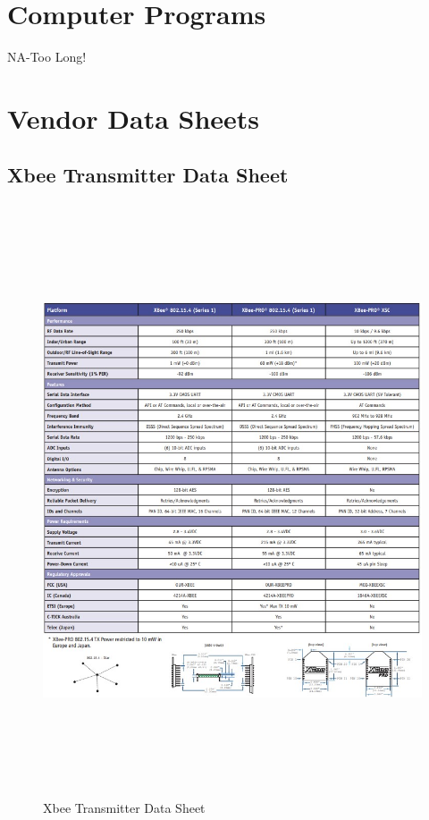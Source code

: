 \documentclass[12pt]{article}
\begin{document}
{{{{		\clearpage
	
	\section{Computer Programs}
	NA-Too Long!
	
	\newpage
	
	\section{Vendor Data Sheets}
	
		\subsection{Xbee Transmitter Data Sheet}
			\begin{figure}[ht!]
				\centering
				\includegraphics[height=175mm]{assets/Xbee_DataSheet.jpg}
				\caption{Xbee Transmitter Data Sheet \label{overflow}}
			\end{figure}
		
}}}}
\end{document}
